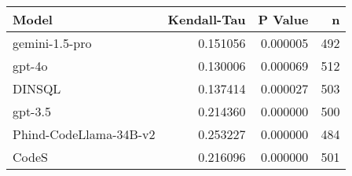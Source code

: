 \begin{tabular}{lrrr}
\toprule
Model & Kendall-Tau & P Value & n \\
\midrule
gemini-1.5-pro & 0.151056 & 0.000005 & 492 \\
gpt-4o & 0.130006 & 0.000069 & 512 \\
DINSQL & 0.137414 & 0.000027 & 503 \\
gpt-3.5 & 0.214360 & 0.000000 & 500 \\
Phind-CodeLlama-34B-v2 & 0.253227 & 0.000000 & 484 \\
CodeS & 0.216096 & 0.000000 & 501 \\
\bottomrule
\end{tabular}
